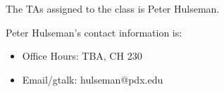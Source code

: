 The TAs assigned to the class is Peter Hulseman. 

Peter Hulseman's contact information is:
\begin{itemize}
\item Office Hours: TBA, CH 230
\item Email/gtalk: hulseman@pdx.edu
\end{itemize}

